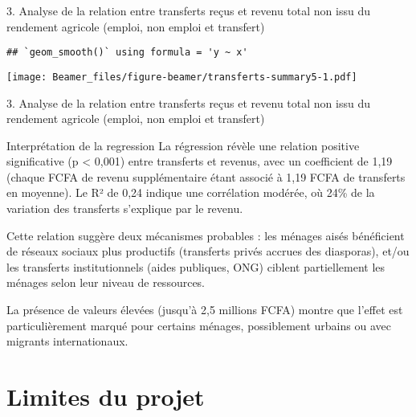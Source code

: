 \documentclass[
  11pt,
  ignorenonframetext,
]{beamer}
\begin{document}
\begin{frame}[fragile]{3. Analyse de la relation entre transferts reçus
et revenu total non issu du rendement agricole (emploi, non emploi et
transfert)}
\label{analyse-de-la-relation-entre-transferts-reuxe7us-et-revenu-total-non-issu-du-rendement-agricole-emploi-non-emploi-et-transfert-1}
\begin{verbatim}
## `geom_smooth()` using formula = 'y ~ x'
\end{verbatim}

\texttt{[image: Beamer\_files/figure-beamer/transferts-summary5-1.pdf]}
\end{frame}

\begin{frame}{3. Analyse de la relation entre transferts reçus et revenu
total non issu du rendement agricole (emploi, non emploi et transfert)}
\label{analyse-de-la-relation-entre-transferts-reuxe7us-et-revenu-total-non-issu-du-rendement-agricole-emploi-non-emploi-et-transfert-2}
\begin{block}{Interprétation de la regression}
\label{interpruxe9tation-de-la-regression-2}
La régression révèle une relation positive significative (p \textless{}
0,001) entre transferts et revenus, avec un coefficient de 1,19 (chaque
FCFA de revenu supplémentaire étant associé à 1,19 FCFA de transferts en
moyenne). Le R² de 0,24 indique une corrélation modérée, où 24\% de la
variation des transferts s'explique par le revenu.

Cette relation suggère deux mécanismes probables : les ménages aisés
bénéficient de réseaux sociaux plus productifs (transferts privés
accrues des diasporas), et/ou les transferts institutionnels (aides
publiques, ONG) ciblent partiellement les ménages selon leur niveau de
ressources.

La présence de valeurs élevées (jusqu'à 2,5 millions FCFA) montre que
l'effet est particulièrement marqué pour certains ménages, possiblement
urbains ou avec migrants internationaux.
\end{block}
\end{frame}

\section{Limites du projet}\label{limites-du-projet}
\end{document}
